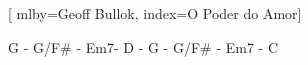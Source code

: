 %

\setcounter{songnum}{126}

[
        mlby={Geoff Bullok},
        index={O Poder do Amor}]

\beginverse*
G - G/F\# - Em7- D - G - G/F\# - Em7 - C
\endverse

